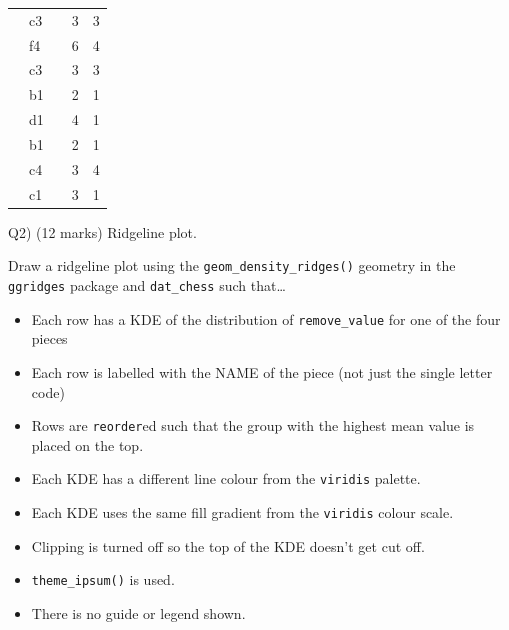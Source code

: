 \documentclass[
]{article}
\providecommand{\tightlist}{%
  \setlength{\itemsep}{0pt}\setlength{\parskip}{0pt}}
\begin{document}
\begin{table}[!t]
\begin{tabular*}{\linewidth}{@{\extracolsep{\fill}}llrrr}
{\cellcolor[HTML]{00FF00}{\textcolor[HTML]{000000}{N}}} & {c3} & {\cellcolor[HTML]{3DC5FF}{\textcolor[HTML]{000000}{556}}} & {3} & {3} \\ 
{\cellcolor[HTML]{FF0000}{\textcolor[HTML]{FFFFFF}{B}}} & {f4} & {\cellcolor[HTML]{3AC6FF}{\textcolor[HTML]{000000}{544}}} & {6} & {4} \\ 
{\cellcolor[HTML]{00FF00}{\textcolor[HTML]{000000}{N}}} & {c3} & {\cellcolor[HTML]{36C7FF}{\textcolor[HTML]{000000}{527}}} & {3} & {3} \\ 
{\cellcolor[HTML]{00FF00}{\textcolor[HTML]{000000}{N}}} & {b1} & {\cellcolor[HTML]{35C8FF}{\textcolor[HTML]{000000}{520}}} & {2} & {1} \\ 
{\cellcolor[HTML]{FF00FF}{\textcolor[HTML]{FFFFFF}{R}}} & {d1} & {\cellcolor[HTML]{2CCAFF}{\textcolor[HTML]{000000}{488}}} & {4} & {1} \\ 
{\cellcolor[HTML]{00FF00}{\textcolor[HTML]{000000}{N}}} & {b1} & {\cellcolor[HTML]{2ACAFF}{\textcolor[HTML]{000000}{483}}} & {2} & {1} \\ 
{\cellcolor[HTML]{FF0000}{\textcolor[HTML]{FFFFFF}{B}}} & {c4} & {\cellcolor[HTML]{22CCFF}{\textcolor[HTML]{000000}{462}}} & {3} & {4} \\ 
{\cellcolor[HTML]{FF0000}{\textcolor[HTML]{FFFFFF}{B}}} & {c1} & {\cellcolor[HTML]{22CCFF}{\textcolor[HTML]{000000}{461}}} & {3} & {1} \\ 
\bottomrule
\end{tabular*}
\end{table}

\newpage

\newpage

Q2) (12 marks) Ridgeline plot.

Draw a ridgeline plot using the \texttt{geom\_density\_ridges()}
geometry in the \texttt{ggridges} package and \texttt{dat\_chess} such
that\ldots{}

\begin{itemize}
\tightlist
\item
  Each row has a KDE of the distribution of \texttt{remove\_value} for
  one of the four pieces
\item
  Each row is labelled with the NAME of the piece (not just the single
  letter code)
\item
  Rows are \texttt{reorder}ed such that the group with the highest mean
  value is placed on the top.
\item
  Each KDE has a different line colour from the \texttt{viridis}
  palette.
\item
  Each KDE uses the same fill gradient from the \texttt{viridis} colour
  scale.
\item
  Clipping is turned off so the top of the KDE doesn't get cut off.
\item
  \texttt{theme\_ipsum()} is used.
\item
  There is no guide or legend shown.
\end{itemize}
\end{document}
